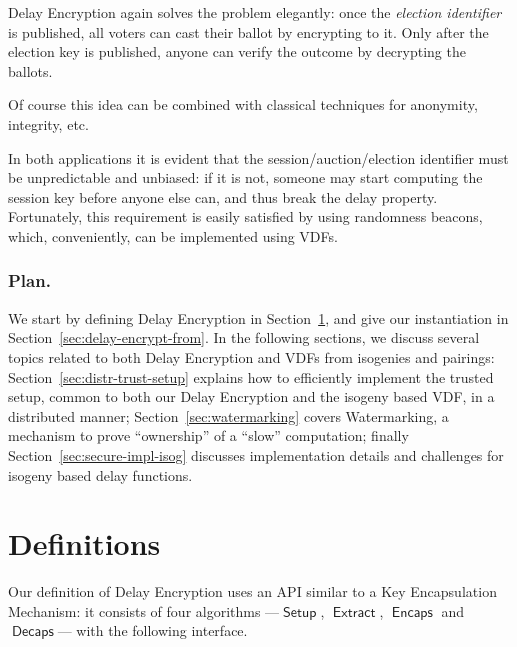 \documentclass{llncs}
\DeclareMathOperator{\Setup}{\mathsf{Setup}}
\DeclareMathOperator{\Extract}{\mathsf{Extract}}
\DeclareMathOperator{\Encaps}{\mathsf{Encaps}}
\DeclareMathOperator{\Decaps}{\mathsf{Decaps}}
\begin{document}
Delay Encryption again solves the problem elegantly: once the
\emph{election identifier} is published, all voters can cast their ballot by
encrypting to it. %
Only after the election key is published, anyone can verify the
outcome by decrypting the ballots. %

Of course this idea can be combined with classical techniques for
anonymity, integrity, etc.

\medskip

In both applications it is evident that the session/auction/election
identifier must be unpredictable and unbiased: if it is not, someone may start
computing the session key before anyone else can, and thus break the
delay property. %
Fortunately, this requirement is easily satisfied by using randomness
beacons, which, conveniently, can be implemented using VDFs.

\subsubsection{Plan.}
We start by defining Delay Encryption in
Section~\ref{sec:definitions}, and give our instantiation in
Section~\ref{sec:delay-encrypt-from}. %
In the following sections, we discuss several topics related to both
Delay Encryption and VDFs from isogenies and pairings:
Section~\ref{sec:distr-trust-setup} explains how to efficiently
implement the trusted setup, common to both our Delay Encryption and
the isogeny based VDF, in a distributed manner;
Section~\ref{sec:watermarking} covers Watermarking, a mechanism to
prove ``ownership'' of a ``slow'' computation; finally
Section~\ref{sec:secure-impl-isog} discusses implementation details
and challenges for isogeny based delay functions.


\section{Definitions}
\label{sec:definitions}

Our definition of Delay Encryption uses an API similar to a Key
Encapsulation Mechanism: it consists of four algorithms ---$\Setup$,
$\Extract$, $\Encaps$ and $\Decaps$--- with the following interface.
\end{document}
